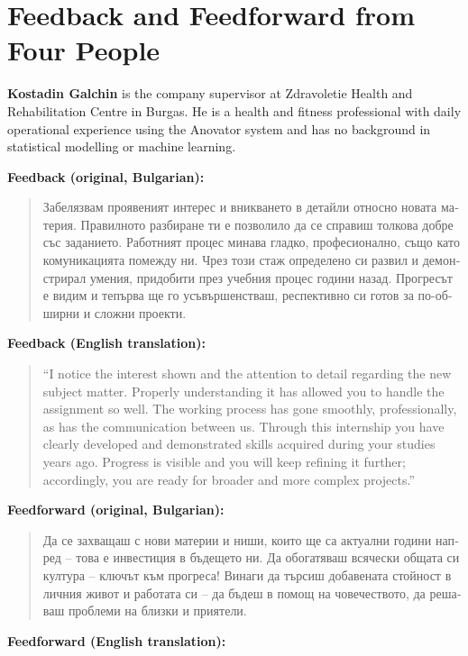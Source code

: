\documentclass[11pt,a4paper]{report}
\begin{document}
\section{Feedback and Feedforward from Four People}

\textbf{Kostadin Galchin} is the company supervisor at Zdravoletie Health and Rehabilitation Centre
in Burgas. He is a health and fitness professional with daily operational experience using the
Anovator system and has no background in statistical modelling or machine learning.

\textbf{Feedback (original, Bulgarian):}

\begin{quote}
\foreignlanguage{bulgarian}{Забелязвам проявеният интерес и вникването в детайли относно новата материя. Правилното разбиране ти е позволило да се справиш толкова добре със заданието. Работният процес минава гладко, професионално, също като комуникацията помежду ни. Чрез този стаж определено си развил и демонстрирал умения, придобити през учебния процес години назад. Прогресът е видим и тепърва ще го усъвършенстваш, респективно си готов за по-обширни и сложни проекти.}
\end{quote}

\textbf{Feedback (English translation):}

\begin{quote}
``I notice the interest shown and the attention to detail regarding the new subject matter. Properly understanding it has allowed you to handle the assignment so well. The working process has gone smoothly, professionally, as has the communication between us. Through this internship you have clearly developed and demonstrated skills acquired during your studies years ago. Progress is visible and you will keep refining it further; accordingly, you are ready for broader and more complex projects.''
\end{quote}

\textbf{Feedforward (original, Bulgarian):}

\begin{quote}
\foreignlanguage{bulgarian}{Да се захващаш с нови материи и ниши, които ще са актуални години напред -- това е инвестиция в бъдещето ни. Да обогатяваш всячески общата си култура -- ключът към прогреса! Винаги да търсиш добавената стойност в личния живот и работата си -- да бъдеш в помощ на човечеството, да решаваш проблеми на близки и приятели.}
\end{quote}

\textbf{Feedforward (English translation):}
\end{document}
